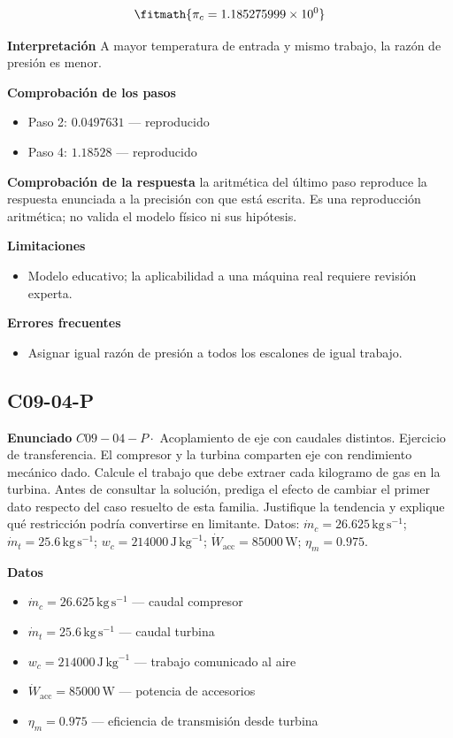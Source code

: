 \documentclass[10pt,openany]{book}
\begin{document}
\[
\fitmath{\pi_c=1.185275999\times10^{0}}
\]

\noindent\textbf{Interpretación}
A mayor temperatura de entrada y mismo trabajo, la razón de presión es menor.

\noindent\textbf{Comprobación de los pasos}
\begin{itemize}
\item Paso 2: $0.0497631$ — reproducido
\item Paso 4: $1.18528$ — reproducido
\end{itemize}

\noindent\textbf{Comprobación de la respuesta} la aritmética del último paso reproduce la respuesta enunciada a la precisión con que está escrita. Es una reproducción aritmética; no valida el modelo físico ni sus hipótesis.

\noindent\textbf{Limitaciones}
\begin{itemize}
\item Modelo educativo; la aplicabilidad a una máquina real requiere revisión experta.
\end{itemize}

\noindent\textbf{Errores frecuentes}
\begin{itemize}
\item Asignar igual razón de presión a todos los escalones de igual trabajo.
\end{itemize}
\subsection*{C09-04-P}

\noindent\textbf{Enunciado}
\(C09-04-P \cdot\) Acoplamiento de eje con caudales distintos. Ejercicio de transferencia. El compresor y la turbina comparten eje con rendimiento mecánico dado. Calcule el trabajo que debe extraer cada kilogramo de gas en la turbina. Antes de consultar la solución, prediga el efecto de cambiar el primer dato respecto del caso resuelto de esta familia. Justifique la tendencia y explique qué restricción podría convertirse en limitante. Datos: \(\dot{m}_c=26.625\, \mathrm{kg}\,\mathrm{s}^{-1}\); \(\dot{m}_t=25.6\, \mathrm{kg}\,\mathrm{s}^{-1}\); \(w_c=214000\, \mathrm{J}\,\mathrm{kg}^{-1}\); \(\dot{W}_{\mathrm{acc}}=85000\, \mathrm{W}\); \(\eta_m=0.975\).

\noindent\textbf{Datos}
\begin{itemize}
\item $\dot{m}_c = 26.625\,\mathrm{kg}\,\mathrm{s}^{-1}$ — caudal compresor
\item $\dot{m}_t = 25.6\,\mathrm{kg}\,\mathrm{s}^{-1}$ — caudal turbina
\item $w_c = 214000\,\mathrm{J}\,\mathrm{kg}^{-1}$ — trabajo comunicado al aire
\item $\dot{W}_{\mathrm{acc}} = 85000\,\mathrm{W}$ — potencia de accesorios
\item $\eta_m = 0.975$ — eficiencia de transmisión desde turbina
\end{itemize}
\end{document}
